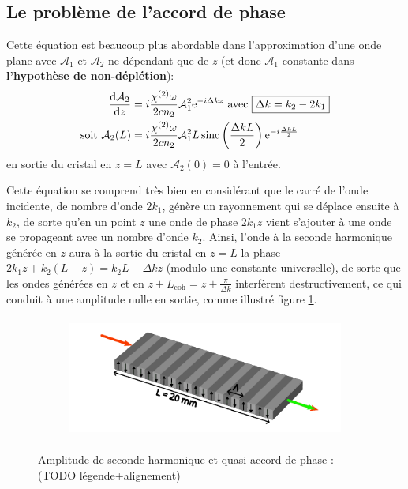 \documentclass[11pt,a4paper] { article}
\newcommand{\A}{\mathcal{A}}
\newcommand{\e}[1]{\text{e}^{#1}}
\newcommand{\mathsc}[1]{\mathrm{\scriptscriptstyle {#1}}}
\begin{document}
\subsection{Le problème de l'accord de phase}

Cette équation est beaucoup plus abordable dans l'approximation d'une onde plane avec $\A_1$ et $\A_2$ ne dépendant que de $z$ (et donc $\A_1$ constante dans \textbf{l'hypothèse de non-déplétion}):
\begin{align}
	\dv{\A_2}{z} &= i\frac{\chi^{(2)}\omega}{2cn_2} \A_1^2 \e{-i \Delta k z} \text{ avec } \boxed{\Delta k = k_2 - 2k_1} \label{eq:pwe} \\
	\text{soit } \A_2(L) &= i \frac{\chi^{(2)}\omega}{2 cn_2} \A_1^2 L \operatorname{sinc}\left( \frac{\Delta k L}{2} \right) \e{-i\frac{\Delta k L}{2}}
\end{align}
en sortie du cristal en $z=L$ avec $\A_2(0)=0$ à l'entrée.

Cette équation se comprend très bien en considérant que le carré de l'onde incidente, de nombre d'onde $2k_1$, génère un rayonnement qui se déplace ensuite à $k_2$, de sorte qu'en un point $z$ une onde de phase $2k_1z$ vient s'ajouter à une onde se propageant avec un nombre d'onde $k_2$. Ainsi, l'onde à la seconde harmonique générée en $z$ aura à la sortie du cristal en $z=L$ la phase $2k_1 z + k_2 (L-z) = k_2 L - \Delta k z$ (modulo une constante universelle), de sorte que les ondes générées en $z$ et en $z+L_\mathsc{coh} =z + \frac{\pi}{\Delta k}$ interfèrent destructivement, ce qui conduit à une amplitude nulle en sortie, comme illustré figure \ref{fig:agen}.

\begin{figure}[htpb] 
\centering
\begin{subfigure}[b]{0.48\textwidth}
	\centering
	\hspace*{-0.8cm}
	
	\caption{}
	\label{fig:agen}
\end{subfigure}
\begin{subfigure}[b]{0.48\textwidth}
	\includegraphics[height=4cm]{./img/PP.pdf}
	\vspace*{2cm}
	\caption{}
	\label{fig:inversion}
\end{subfigure}
\hspace*{-0.6cm}
\caption{Amplitude de seconde harmonique et quasi-accord de phase : \small  (TODO légende+alignement)} %
\label{fig:QPM}
\end{figure}
\end{document}
